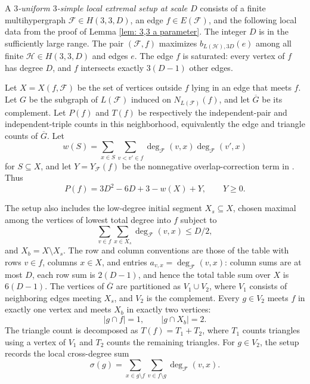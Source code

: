 \begin{definition}
A \emph{$3$-uniform $3$-simple local extremal setup at scale $D$} consists
of a finite multihypergraph $\mathcal F\in H(3,3,D)$, an edge
$f\in E(\mathcal F)$, and the following local data from the proof of Lemma
\ref{lem: 3,3 a parameter}.  The integer $D$ is in the sufficiently large
range.  The pair $(\mathcal F,f)$ maximizes
$b_{L(\mathcal H),3D}(e)$ among all finite $\mathcal H\in H(3,3,D)$ and
edges $e$.  The edge $f$ is saturated: every vertex of $f$ has degree $D$,
and $f$ intersects exactly $3(D-1)$ other edges.

Let $X=X(f,\mathcal F)$ be the set of vertices outside $f$ lying in an edge
that meets $f$.  Let $G$ be the subgraph of $L(\mathcal F)$ induced on
$N_{L(\mathcal F)}(f)$, and let $\overline G$ be its complement.  Let
$P(f)$ and $T(f)$ be respectively the independent-pair and independent-triple
counts in this neighborhood, equivalently the edge and triangle counts of
$\overline G$.  Let
\[
w(S)=\sum_{x\in S}\sum_{v<v'\in f}
\deg_{\mathcal F}(v,x)\deg_{\mathcal F}(v',x)
\]
for $S\subseteq X$, and let $Y=Y_{\mathcal F}(f)$ be the nonnegative
overlap-correction term in .  Thus
\[
P(f)=3D^2-6D+3-w(X)+Y,\qquad Y\ge0.
\]

The setup also includes the low-degree initial segment $X_s\subseteq X$,
chosen maximal among the vertices of lowest total degree into $f$ subject to
\[
\sum_{v\in f}\sum_{x\in X_s}\deg_{\mathcal F}(v,x)\le D/2,
\]
and $X_b=X\setminus X_s$.  The row and column conventions are those of the
table with rows $v\in f$, columns $x\in X$, and entries
$a_{v,x}=\deg_{\mathcal F}(v,x)$: column sums are at most $D$, each row sum is
$2(D-1)$, and hence the total table sum over $X$ is $6(D-1)$.  The vertices
of $\overline G$ are partitioned as $V_1\cup V_2$, where $V_1$ consists of
neighboring edges meeting $X_s$, and $V_2$ is the complement.  Every
$g\in V_2$ meets $f$ in exactly one vertex and meets $X_b$ in exactly two
vertices:
\[
|g\cap f|=1,\qquad |g\cap X_b|=2.
\]
The triangle count is decomposed as $T(f)=T_1+T_2$, where $T_1$ counts
triangles using a vertex of $V_1$ and $T_2$ counts the remaining triangles.
For
$g\in V_2$, the setup records the local cross-degree sum
\[
\sigma(g)=
\sum_{x\in g\setminus f}\sum_{v\in f\setminus g}
\deg_{\mathcal F}(v,x).
\]
\end{definition}
